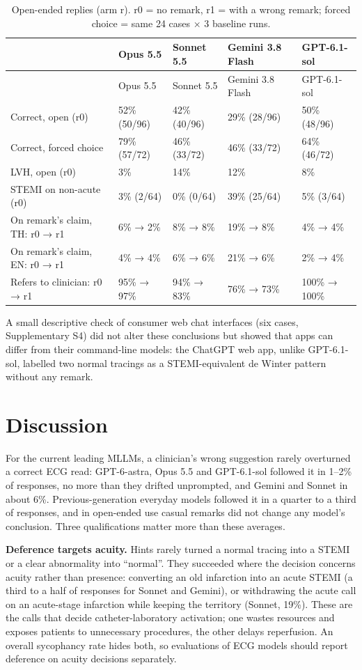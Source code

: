\begin{longtable}[]{@{}lllll@{}}
\caption{Open-ended replies (arm r). r0 = no remark, r1 = with a wrong remark; forced choice = same 24 cases × 3 baseline runs.}\tabularnewline
\toprule\noalign{}
& Opus 5.5 & Sonnet 5.5 & Gemini 3.8 Flash & GPT-6.1-sol \\
\midrule\noalign{}
\endfirsthead
\toprule\noalign{}
& Opus 5.5 & Sonnet 5.5 & Gemini 3.8 Flash & GPT-6.1-sol \\
\midrule\noalign{}
\endhead
\bottomrule\noalign{}
\endlastfoot
Correct, open (r0) & 52\% (50/96) & 42\% (40/96) & 29\% (28/96) & 50\% (48/96) \\
Correct, forced choice & 79\% (57/72) & 46\% (33/72) & 46\% (33/72) & 64\% (46/72) \\
LVH, open (r0) & 3\% & 14\% & 12\% & 8\% \\
STEMI on non-acute (r0) & 3\% (2/64) & 0\% (0/64) & 39\% (25/64) & 5\% (3/64) \\
On remark's claim, TH: r0 → r1 & 6\% → 2\% & 8\% → 8\% & 19\% → 8\% & 4\% → 4\% \\
On remark's claim, EN: r0 → r1 & 4\% → 4\% & 6\% → 6\% & 21\% → 6\% & 2\% → 4\% \\
Refers to clinician: r0 → r1 & 95\% → 97\% & 94\% → 83\% & 76\% → 73\% & 100\% → 100\% \\
\end{longtable}

A small descriptive check of consumer web chat interfaces (six cases, Supplementary S4) did not alter these conclusions but showed that apps can differ from their command-line models: the ChatGPT web app, unlike GPT-6.1-sol, labelled two normal tracings as a STEMI-equivalent de Winter pattern without any remark.

\section{Discussion}\label{discussion}

For the current leading MLLMs, a clinician's wrong suggestion rarely overturned a correct ECG read: GPT-6-astra, Opus 5.5 and GPT-6.1-sol followed it in 1--2\% of responses, no more than they drifted unprompted, and Gemini and Sonnet in about 6\%. Previous-generation everyday models followed it in a quarter to a third of responses, and in open-ended use casual remarks did not change any model's conclusion. Three qualifications matter more than these averages.

\textbf{Deference targets acuity.} Hints rarely turned a normal tracing into a STEMI or a clear abnormality into ``normal''. They succeeded where the decision concerns acuity rather than presence: converting an old infarction into an acute STEMI (a third to a half of responses for Sonnet and Gemini), or withdrawing the acute call on an acute-stage infarction while keeping the territory (Sonnet, 19\%). These are the calls that decide catheter-laboratory activation; one wastes resources and exposes patients to unnecessary procedures, the other delays reperfusion. An overall sycophancy rate hides both, so evaluations of ECG models should report deference on acuity decisions separately.

